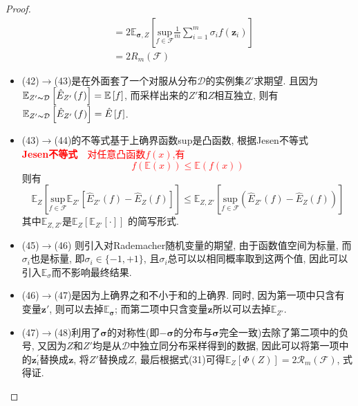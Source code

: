 \begin{proof}
\begin{equation}
\begin{aligned}
&= 2\mathbb{E}_{\boldsymbol{\sigma},Z}\left[ \underset{f\in \mathcal{F}}{\text{sup}}\frac{1}{m}\sum_{i=1}^m{\sigma _if\left( \boldsymbol{z}_i \right)} \right]\\
&= 2R_m\left( \mathcal{F} \right)
\end{aligned}
\end{equation}
\par
\begin{itemize}
  \item (42)$\rightarrow$(43)是在外面套了一个对服从分布$\mathcal{D}$的实例集$Z'$求期望. 且因为$\mathbb{E}_{Z'\thicksim \mathcal{D}}\left[ \hat{E}_{Z'}\left( f \right) \right] =\mathbb{E}\left[ f \right] $, 而采样出来的$Z'$和$Z$相互独立, 则有$\mathbb{E}_{Z'\thicksim \mathcal{D}}\left[ \hat{E}_{Z'}\left( f \right) \right] =\hat{E}\left[ f \right] $.
  \item (43)$\rightarrow$(44)的不等式基于上确界函数sup是凸函数, 根据Jesen不等式\\
  \textcolor{red}{
 \textbf{ Jesen不等式}\ \ 对任意凸函数$f(x)$,有
  \begin{equation}
  f\left( \mathbb{E}\left( x \right) \right) \le \mathbb{E}\left( f\left( x \right) \right)
  \end{equation}
  }
  则有
  \begin{equation}
  \mathbb{E}_Z\left[ \underset{f\in \mathcal{F}}{\text{sup}}\mathbb{E}_{Z'}\left[ \hat{E}_{Z'}\left( f \right) -\hat{E}_Z\left( f \right) \right] \right] \le \mathbb{E}_{Z,Z'}\left[ \underset{f\in \mathcal{F}}{\text{sup}}\left( \hat{E}_{Z'}\left( f \right) -\hat{E}_Z\left( f \right) \right) \right]
  \end{equation}
  其中$\mathbb{E}_{Z,Z'}$是$\mathbb{E}_Z\left[ \mathbb{E}_{Z'}\left[ \cdot \right] \right] $ 的简写形式.
  \item (45)$\rightarrow$(46)  则引入对Rademacher随机变量的期望, 由于函数值空间为标量, 而$\sigma_i$也是标量, 即$\sigma_i \in \{-1,+1\}$, 且$\sigma_i$总可以以相同概率取到这两个值, 因此可以引入$\mathbb{E}_{\sigma}$而不影响最终结果.
  \item (46)$\rightarrow$(47)是因为上确界之和不小于和的上确界. 同时, 因为第一项中只含有变量$\mathbf{z}'$, 则可以去掉$\mathbb{E}_{\boldsymbol{\sigma}}$; 而第二项中只含变量$\mathbf{z}$所以可以去掉$\mathbb{E}_{Z'}$.
  \item (47)$\rightarrow$(48)利用了$\boldsymbol{\sigma}$的对称性(即$-\boldsymbol{\sigma}$的分布与$\boldsymbol{\sigma}$完全一致)去除了第二项中的负号, 又因为$Z$和$Z'$均是从$\mathcal{D}$中独立同分布采样得到的数据, 因此可以将第一项中的$\mathbf{z}_{i}^{'}$替换成$\mathbf{z}$, 将$Z'$替换成$Z$, 最后根据式(31)可得$\mathbb{E}_Z\left[ \varPhi \left( Z \right) \right] =2\mathcal{R}_m\left( \mathcal{F} \right) $, 式得证.
\end{itemize}
\end{proof}

